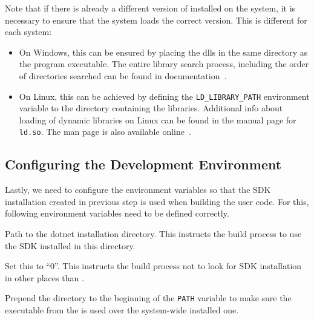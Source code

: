 Note that if there is already a different version of \libopenssl{} installed on the system, it is
necessary to ensure that the system loads the correct \libopenssl{} version. This is different for
each system:

\begin{itemize}

  \item On Windows, this can be ensured by placing the dlls in the same directory as the program
        executable. The entire library search process, including the order of directories searched
        can be found in documentation~\cite{windowsDllSearch}.

  \item On Linux, this can be achieved by defining the \texttt{LD_LIBRARY_PATH} environment variable
        to the directory containing the \libopenssl{} libraries. Additional info about loading of
        dynamic libraries on Linux can be found in the manual page for \texttt{ld.so}. The man page
        is also available online~\cite{linuxDllSearch}.

\end{itemize}

\subsection{Configuring the Development Environment}\label{sec:06-env-vars}

Lastly, we need to configure the environment variables so that the \dotnet{} SDK installation created in previous step is used when building the user code. For this, following environment variables need to be defined correctly.

\begin{description}

         Path to the dotnet installation directory. This instructs the build process to use the SDK installed in this directory.

         Set this to ``0''. This instructs the build process not to look for SDK installation in other places than .

         Prepend the  directory to the beginning of the \texttt{PATH} variable to make sure the  executable from the  is used over the system-wide installed one.
\end{description}

